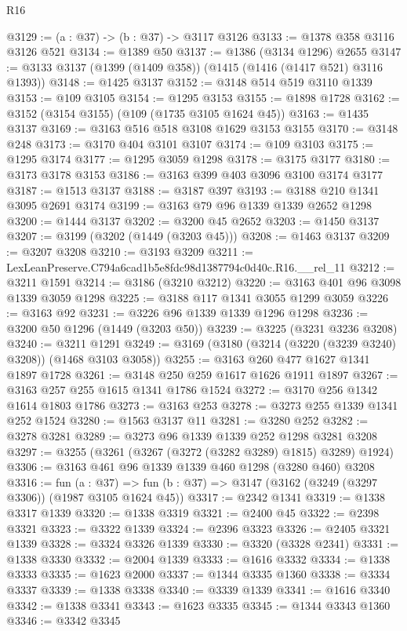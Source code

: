 \begin{lexlean}{R16}
\begin{coremodule}
@3129 := (a : @37) -> (b : @37) -> @3117 @3126
@3133 := @1378 @358 @3116 @3126 @521
@3134 := @1389 @50
@3137 := @1386 (@3134 @1296) @2655
@3147 := @3133 @3137 (@1399 (@1409 @358)) (@1415 (@1416 (@1417 @521) @3116 @1393))
@3148 := @1425 @3137
@3152 := @3148 @514 @519 @3110 @1339
@3153 := @109 @3105
@3154 := @1295 @3153
@3155 := @1898 @1728
@3162 := @3152 (@3154 @3155) (@109 (@1735 @3105 @1624 @45))
@3163 := @1435 @3137
@3169 := @3163 @516 @518 @3108 @1629 @3153 @3155
@3170 := @3148 @248
@3173 := @3170 @404 @3101 @3107
@3174 := @109 @3103
@3175 := @1295 @3174
@3177 := @1295 @3059 @1298
@3178 := @3175 @3177
@3180 := @3173 @3178 @3153
@3186 := @3163 @399 @403 @3096 @3100 @3174 @3177
@3187 := @1513 @3137
@3188 := @3187 @397
@3193 := @3188 @210 @1341 @3095 @2691 @3174
@3199 := @3163 @79 @96 @1339 @1339 @2652 @1298
@3200 := @1444 @3137
@3202 := @3200 @45 @2652
@3203 := @1450 @3137
@3207 := @3199 (@3202 (@1449 (@3203 @45)))
@3208 := @1463 @3137
@3209 := @3207 @3208
@3210 := @3193 @3209
@3211 := LexLeanPreserve.C794a6cad1b5e8fdc98d1387794c0d40c.R16.__rel_11
@3212 := @3211 @1591
@3214 := @3186 (@3210 @3212)
@3220 := @3163 @401 @96 @3098 @1339 @3059 @1298
@3225 := @3188 @117 @1341 @3055 @1299 @3059
@3226 := @3163 @92
@3231 := @3226 @96 @1339 @1339 @1296 @1298
@3236 := @3200 @50 @1296 (@1449 (@3203 @50))
@3239 := @3225 (@3231 @3236 @3208)
@3240 := @3211 @1291
@3249 := @3169 (@3180 (@3214 (@3220 (@3239 @3240) @3208)) (@1468 @3103 @3058))
@3255 := @3163 @260 @477 @1627 @1341 @1897 @1728
@3261 := @3148 @250 @259 @1617 @1626 @1911 @1897
@3267 := @3163 @257 @255 @1615 @1341 @1786 @1524
@3272 := @3170 @256 @1342 @1614 @1803 @1786
@3273 := @3163 @253
@3278 := @3273 @255 @1339 @1341 @252 @1524
@3280 := @1563 @3137 @11
@3281 := @3280 @252
@3282 := @3278 @3281
@3289 := @3273 @96 @1339 @1339 @252 @1298 @3281 @3208
@3297 := @3255 (@3261 (@3267 (@3272 (@3282 @3289) @1815) @3289) @1924)
@3306 := @3163 @461 @96 @1339 @1339 @460 @1298 (@3280 @460) @3208
@3316 := fun (a : @37) =>
  fun (b : @37) => @3147 (@3162 (@3249 (@3297 @3306)) (@1987 @3105 @1624 @45))
@3317 := @2342 @1341
@3319 := @1338 @3317 @1339
@3320 := @1338 @3319
@3321 := @2400 @45
@3322 := @2398 @3321
@3323 := @3322 @1339
@3324 := @2396 @3323
@3326 := @2405 @3321 @1339
@3328 := @3324 @3326 @1339
@3330 := @3320 (@3328 @2341)
@3331 := @1338 @3330
@3332 := @2004 @1339
@3333 := @1616 @3332
@3334 := @1338 @3333
@3335 := @1623 @2000
@3337 := @1344 @3335 @1360
@3338 := @3334 @3337
@3339 := @1338 @3338
@3340 := @3339 @1339
@3341 := @1616 @3340
@3342 := @1338 @3341
@3343 := @1623 @3335
@3345 := @1344 @3343 @1360
@3346 := @3342 @3345

\end{coremodule}
\end{lexlean}
